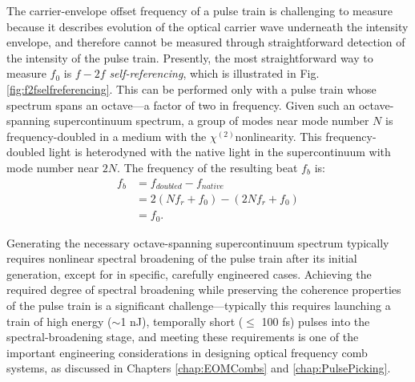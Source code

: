 The carrier-envelope offset frequency of a pulse train is challenging to measure because it describes evolution of the optical carrier wave underneath the intensity envelope, and therefore cannot be measured through straightforward detection of the intensity of the pulse train. Presently, the most straightforward way to measure $f_0$ is $f-2f$ \textit{self-referencing}, which is illustrated in Fig.\ref{fig:f2fselfreferencing}. This can be performed only with a pulse train whose spectrum spans an octave---a factor of two in frequency. Given such an octave-spanning supercontinuum spectrum, a group of modes near mode number $N$ is frequency-doubled in a medium with the $\chi^{(2)}$nonlinearity\cite{Boyd2003}. This frequency-doubled light is heterodyned with the native light in the supercontinuum with mode number near $2N$. The frequency of the resulting beat $f_b$ is:
\begin{align}
f_b&=f_{doubled}-f_{native}\\
&=2(Nf_r+f_0)-(2Nf_r+f_0)\\
&=f_0.
\end{align}

Generating the necessary octave-spanning supercontinuum spectrum typically requires nonlinear spectral broadening of the pulse train after its initial generation, except for in specific, carefully engineered cases. Achieving the required degree of spectral broadening while preserving the coherence properties of the pulse train is a significant challenge---typically this requires launching a train of high energy ($\sim$1 nJ), temporally short ($\leq$ 100 fs) pulses into the spectral-broadening stage, and meeting these requirements is one of the important engineering considerations in designing optical frequency comb systems, as discussed in Chapters \ref{chap:EOMCombs} and \ref{chap:PulsePicking}. 


